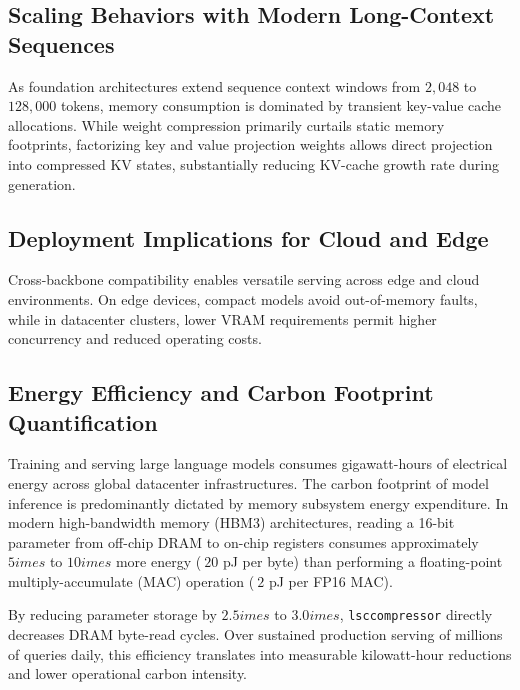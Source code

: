 \subsection{Scaling Behaviors with Modern Long-Context Sequences}
As foundation architectures extend sequence context windows from $2{,}048$ to $128{,}000$ tokens, memory consumption is dominated by transient key-value cache allocations. While weight compression primarily curtails static memory footprints, factorizing key and value projection weights allows direct projection into compressed KV states, substantially reducing KV-cache growth rate during generation.

\subsection{Deployment Implications for Cloud and Edge}
Cross-backbone compatibility enables versatile serving across edge and cloud environments. On edge devices, compact models avoid out-of-memory faults, while in datacenter clusters, lower VRAM requirements permit higher concurrency and reduced operating costs.

\subsection{Energy Efficiency and Carbon Footprint Quantification}
Training and serving large language models consumes gigawatt-hours of electrical energy across global datacenter infrastructures. The carbon footprint of model inference is predominantly dictated by memory subsystem energy expenditure. In modern high-bandwidth memory (HBM3) architectures, reading a 16-bit parameter from off-chip DRAM to on-chip registers consumes approximately $5	imes$ to $10	imes$ more energy ($~20$ pJ per byte) than performing a floating-point multiply-accumulate (MAC) operation ($~2$ pJ per FP16 MAC).

By reducing parameter storage by $2.5	imes$ to $3.0	imes$, \texttt{lsccompressor} directly decreases DRAM byte-read cycles. Over sustained production serving of millions of queries daily, this efficiency translates into measurable kilowatt-hour reductions and lower operational carbon intensity.

